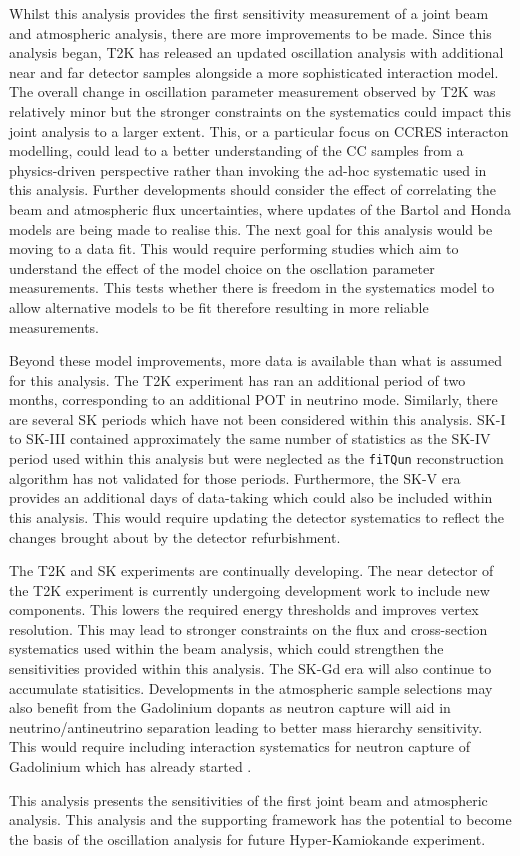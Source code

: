 Whilst this analysis provides the first sensitivity measurement of a joint beam and atmospheric analysis, there are more improvements to be made. Since this analysis began, T2K has released an updated oscillation analysis with additional near and far detector samples alongside a more sophisticated interaction model. The overall change in oscillation parameter measurement observed by T2K was relatively minor \cite{Bronner2022-wd} but the stronger constraints on the systematics could impact this joint analysis to a larger extent. This, or a particular focus on CCRES interacton modelling, could lead to a better understanding of the CC\quickmath{1\pi} samples from a physics-driven perspective rather than invoking the ad-hoc systematic used in this analysis. Further developments should consider the effect of correlating the beam and atmospheric flux uncertainties, where updates of the Bartol and Honda models are being made to realise this. The next goal for this analysis would be moving to a data fit. This would require performing studies which aim to understand the effect of the model choice on the oscllation parameter measurements. This tests whether there is freedom in the systematics model to allow alternative models to be fit therefore resulting in more reliable measurements. 

Beyond these model improvements, more data is available than what is assumed for this analysis. The T2K experiment has ran an additional period of two months, corresponding to an additional POT in neutrino mode. Similarly, there are several SK periods which have not been considered within this analysis. SK-I to SK-III contained approximately the same number of statistics as the SK-IV period used within this analysis but were neglected as the \texttt{fiTQun} reconstruction algorithm has not validated for those periods. Furthermore, the SK-V era provides an additional  days of data-taking which could also be included within this analysis. This would require updating the detector systematics to reflect the changes brought about by the detector refurbishment.

The T2K and SK experiments are continually developing. The near detector of the T2K experiment is currently undergoing development work to include new components. This lowers the required energy thresholds and improves vertex resolution. This may lead to stronger constraints on the flux and cross-section systematics used within the beam analysis, which could strengthen the sensitivities provided within this analysis. The SK-Gd era will also continue to accumulate statisitics. Developments in the atmospheric sample selections may also benefit from the Gadolinium dopants as neutron capture will aid in neutrino/antineutrino separation leading to better mass hierarchy sensitivity. This would require including interaction systematics for neutron capture of Gadolinium which has already started \cite{10.48550/arxiv.2209.08609}.

This analysis presents the sensitivities of the first joint beam and atmospheric analysis. This analysis and the supporting framework has the potential to become the basis of the oscillation analysis for future Hyper-Kamiokande experiment.
